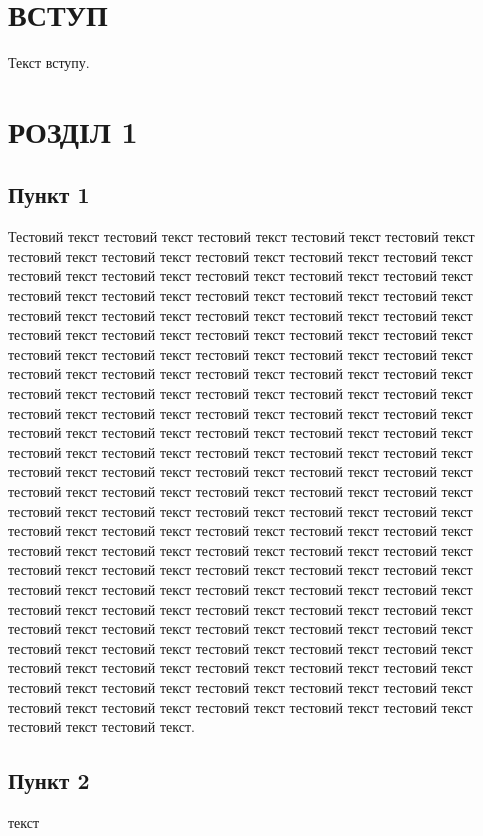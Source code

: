 \documentclass[14pt]{extarticle}
\newcommand{\issectionnumbered}{1}
\newcommand{\unnumberedsection}[1]{
\renewcommand{\issectionnumbered}{0}
\section*{#1}
\addcontentsline{toc}{section}{#1}
\renewcommand{\issectionnumbered}{1}
}
\begin{document}
\tableofcontents
\newpage

\vspace{1in}

\unnumberedsection{ВСТУП}

Текст вступу.

\section{РОЗДІЛ 1}
\subsection{Пункт 1}
Тестовий текст тестовий текст тестовий текст тестовий текст тестовий текст тестовий текст тестовий текст тестовий текст тестовий текст тестовий текст тестовий текст тестовий текст тестовий текст тестовий текст тестовий текст тестовий текст тестовий текст тестовий текст тестовий текст тестовий текст тестовий текст тестовий текст тестовий текст тестовий текст тестовий текст тестовий текст тестовий текст тестовий текст тестовий текст тестовий текст тестовий текст тестовий текст тестовий текст тестовий текст тестовий текст тестовий текст тестовий текст тестовий текст тестовий текст тестовий текст тестовий текст тестовий текст тестовий текст тестовий текст тестовий текст тестовий текст тестовий текст тестовий текст тестовий текст тестовий текст тестовий текст тестовий текст тестовий текст тестовий текст тестовий текст тестовий текст тестовий текст тестовий текст тестовий текст тестовий текст тестовий текст тестовий текст тестовий текст тестовий текст тестовий текст тестовий текст тестовий текст тестовий текст тестовий текст тестовий текст тестовий текст тестовий текст тестовий текст тестовий текст тестовий текст тестовий текст тестовий текст тестовий текст тестовий текст тестовий текст тестовий текст тестовий текст тестовий текст тестовий текст тестовий текст тестовий текст тестовий текст тестовий текст тестовий текст тестовий текст тестовий текст тестовий текст тестовий текст тестовий текст тестовий текст тестовий текст тестовий текст тестовий текст тестовий текст тестовий текст тестовий текст тестовий текст тестовий текст тестовий текст тестовий текст тестовий текст тестовий текст тестовий текст тестовий текст тестовий текст тестовий текст тестовий текст тестовий текст тестовий текст тестовий текст тестовий текст тестовий текст тестовий текст тестовий текст тестовий текст тестовий текст тестовий текст тестовий текст тестовий текст тестовий текст тестовий текст тестовий текст.
\subsection{Пункт 2}
текст
\end{document}
